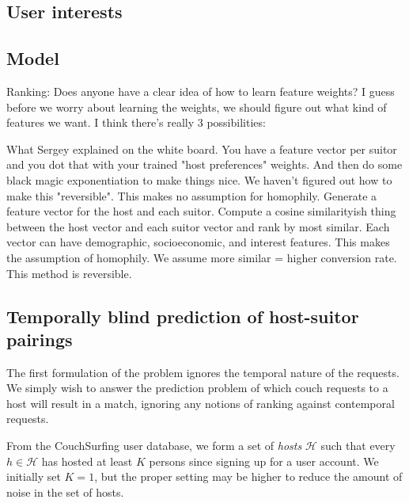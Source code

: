 \documentclass[11pt]{article}
\begin{document}
\subsection{User interests}

\subsection{Model}
Ranking:
Does anyone have a clear idea of how to learn feature weights?  I guess before we worry about learning the weights, we should figure out what kind of features we want.  I think there's really 3 possibilities:

What Sergey explained on the white board.  You have a feature vector per suitor and you dot that with your trained "host preferences" weights. And then do some black magic exponentiation to make things nice. We haven't figured out how to make this "reversible".  This makes no assumption for homophily.
Generate a feature vector for the host and each suitor. Compute a cosine similarityish thing between the host vector and each suitor vector and rank by most similar. Each vector can have demographic, socioeconomic, and interest features.  This makes the assumption of homophily. We assume more similar = higher conversion rate. This method is reversible.


\subsection{Temporally blind prediction of host-suitor pairings}
The first formulation of the problem ignores the temporal nature of the requests.
We simply wish to answer the prediction problem of which couch requests to a host will result in a match, ignoring any notions of ranking against contemporal requests.

From the CouchSurfing user database, we form a set of \emph{hosts} $\mathcal{H}$ such that every $h \in \mathcal{H}$ has hosted at least $K$ persons since signing up for a user account.
We initially set $K=1$, but the proper setting may be higher to reduce the amount of noise in the set of hosts.
\end{document}
